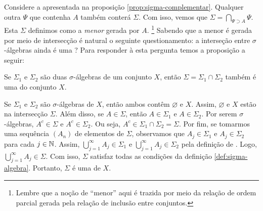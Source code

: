 Considere a \sigal apresentada na proposição \ref{prop:sigma-complementar}. 
Qualquer outra \sigal $\Psi$ que contenha $A$ também conterá $\Sigma$.
Com isso, vemos que $\Sigma = \displaystyle \bigcap_{\Psi \supset A} \Psi$.
Esta \sigal $\Sigma$   definimos como a \textit{menor} \sigal gerada por $A$. 
\footnote{Lembre que a noção de \enquote{menor} aqui é trazida por meio da relação de ordem parcial gerada pela relação de inclusão entre conjuntos.}
Sabendo que a menor \sigal é gerada por meio de intersecção é natural o seguinte questionamento: a interseção entre $\sigma$-álgebras ainda é uma \sigal? Para responder à esta pergunta temos a proposição a seguir:
\begin{proposition}
\label{prop:interseção-2sigmas}
    Se $\Sigma_1$ e $\Sigma_2$ são duas $\sigma$-álgebras de um conjunto $X$, então $\Sigma = \Sigma_1 \cap \Sigma_2$ também é uma \sigal do conjunto $X$.
\end{proposition}

\begin{prova}
    Se $\Sigma_1$ e $\Sigma_2$ são $\sigma$-álgebras de $X$, então ambos contêm $\varnothing$ e $X$.
    Assim, $\varnothing$ e $X$ estão na intersecção $\Sigma$.
    Além disso, se $A \in \Sigma$, então $A \in \Sigma_1$ e $A \in \Sigma_2$. 
    Por serem $\sigma$-álgebras, $A^c \in \Sigma$ e $A^c \in \Sigma_2$.
    Ou seja, $A^c \in \Sigma_1 \cap \Sigma_2 = \Sigma$.
    Por fim, se tomarmos uma sequência $(A_n)$ de elementos de $\Sigma$, observamos que $A_j \in \Sigma_1$ e $A_j \in \Sigma_2$ para cada $j \in \operatorname{\mathbb{N}}$.
    Assim, $\displaystyle \bigcup_{j = 1}^\infty A_j \in \Sigma_1$ e 
    $\displaystyle \bigcup_{j = 1}^\infty A_j \in \Sigma_2$ pela definição de \sigal.
    Logo, $\displaystyle \bigcup_{j = 1}^\infty A_j \in \Sigma$.
    Com isso, $\Sigma$ satisfaz todas as condições da definição \ref{def:sigma-algebra}. 
    Portanto, $\Sigma$ é uma \sigal de $X$.
\end{prova}

